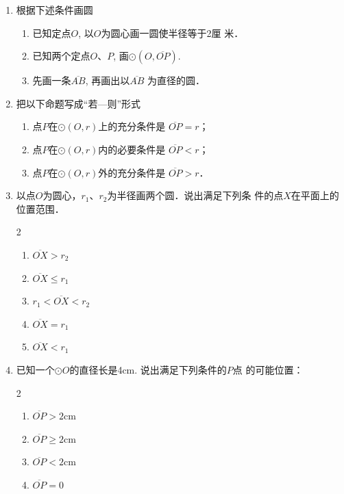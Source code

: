 \begin{ex}
\begin{enumerate}
    \item 根据下述条件画圆
\begin{enumerate}
\item 已知定点$O$, 以$O$为圆心画一圆使半径等于2厘
米．
\item 已知两个定点$O$、$P$, 画$\odot(O,\overline{OP})$.
\item 先画一条$\overline{AB}$, 再画出以$\overline{AB}$
为直径的圆．
\end{enumerate}

\item 把以下命题写成“若—则”形式
\begin{enumerate}
\item 点$P$在$\odot(O,r)$上的充分条件是
$\overline{OP}=r$；
\item 点$P$在$\odot(O,r)$内的必要条件是
$\overline{OP}<r$；
\item 点$P$在$\odot(O,r)$外的充分条件是
$\overline{OP}>r$．
\end{enumerate}


\item 以点$O$为圆心，$r_1$、$r_2$为半径画两个圆．说出满足下列条
件的点$X$在平面上的位置范围．
\begin{multicols}{2}
\begin{enumerate}
    \item $\overline{OX} >r_2$
    \item $\overline{OX} \le r_1$
    \item $r_1<\overline{OX}<r_2 $
    \item $\overline{OX}=r_1 $
    \item $\overline{OX}<r_1 $
\end{enumerate}
\end{multicols}

\item 已知一个$\odot O$的直径长是4cm. 说出满足下列条件的$P$点
的可能位置：
\begin{multicols}{2}
    \begin{enumerate}
        \item $\overline{OP} >2$cm
        \item $\overline{OP} \ge 2$cm
        \item $\overline{OP} <2$cm
        \item $\overline{OP} =0$
    \end{enumerate}
    \end{multicols}


\end{enumerate}
\end{ex}
